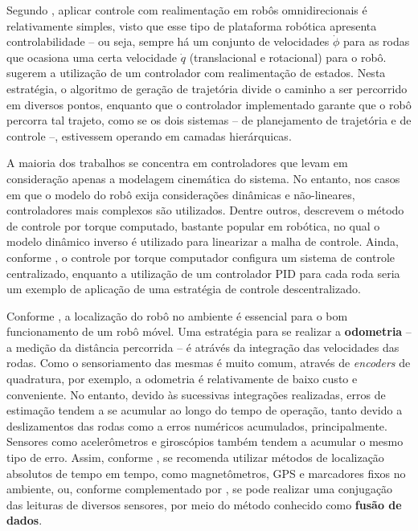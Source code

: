 Segundo \citet{lynch2017modern}, aplicar controle com realimentação em robôs omnidirecionais é relativamente simples, visto que esse tipo de plataforma robótica apresenta controlabilidade -- ou seja, sempre há um conjunto de velocidades \textbf{$\dot\phi$} para as rodas que ocasiona uma certa velocidade \textbf{$\dot{q}$} (translacional e rotacional) para o robô. \citet{siegwart2011introduction} sugerem a utilização de um controlador com realimentação de estados. Nesta estratégia, o algoritmo de geração de trajetória divide o caminho a ser percorrido em diversos pontos, enquanto que o controlador implementado garante que o robô percorra tal trajeto, como se os dois sistemas -- de planejamento de trajetória e de controle --, estivessem operando em camadas hierárquicas.

A maioria dos trabalhos se concentra em controladores que levam em consideração apenas a modelagem cinemática do sistema. No entanto, nos casos em que o modelo do robô exija considerações dinâmicas e não-lineares, controladores mais complexos são utilizados. Dentre outros, \citet{siciliano2016springer} descrevem o método de controle por torque computado, bastante popular em robótica, no qual o modelo dinâmico inverso é utilizado para linearizar a malha de controle. Ainda, conforme \citet{indiveri2009swedish}, o controle por torque computador configura um sistema de controle centralizado, enquanto a utilização de um controlador PID para cada roda seria um exemplo de aplicação de uma estratégia de controle descentralizado.

Conforme \citet{lynch2017modern}, a localização do robô no ambiente é essencial para o bom funcionamento de um robô móvel. Uma estratégia para se realizar a \textbf{odometria} -- a medição da distância percorrida -- é atrávés da integração das velocidades das rodas. Como o sensoriamento das mesmas é muito comum, através de \textit{encoders} de quadratura, por exemplo, a odometria é relativamente de baixo custo e conveniente. No entanto, devido às sucessivas integrações realizadas, erros de estimação tendem a se acumular ao longo do tempo de operação, tanto devido a deslizamentos das rodas como a erros numéricos acumulados, principalmente. Sensores como acelerômetros e giroscópios também tendem a acumular o mesmo tipo de erro. Assim, conforme \citet{siegwart2011introduction}, se recomenda utilizar métodos de localização absolutos de tempo em tempo, como magnetômetros, GPS e marcadores fixos no ambiente, ou, conforme complementado por \citet{lynch2017modern}, se pode realizar uma conjugação das leituras de diversos sensores, por meio do método conhecido como \textbf{fusão de dados}.


